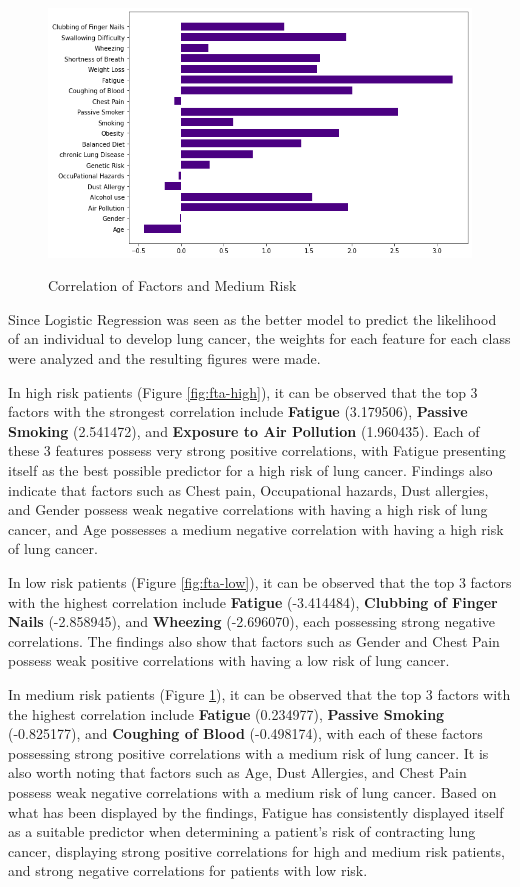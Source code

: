 \documentclass[runningheads]{llncs}
\begin{document}
\begin{figure}[h]           	 
\centering               	 
\caption{Correlation of Factors and Medium Risk}
\includegraphics[scale=0.5]{fta-medium.png}  	 
\label{fig:fta-medium}
\end{figure}

Since Logistic Regression was seen as the better model to predict the likelihood of an individual to develop lung cancer, the weights for each feature for each class were analyzed and the resulting figures were made.

In high risk patients (Figure \ref{fig:fta-high}), it can be observed that the top 3 factors with the strongest correlation include \textbf{Fatigue} (3.179506), \textbf{Passive Smoking} (2.541472), and \textbf{Exposure to Air Pollution} (1.960435). Each of these 3 features possess very strong positive correlations, with Fatigue presenting itself as the best possible predictor for a high risk of lung cancer. Findings also indicate that factors such as Chest pain, Occupational hazards, Dust allergies, and Gender possess weak negative correlations with having a high risk of lung cancer, and Age possesses a medium negative correlation with having a high risk of lung cancer.

In low risk patients (Figure \ref{fig:fta-low}), it can be observed that the top 3 factors with the highest correlation include \textbf{Fatigue} (-3.414484), \textbf{Clubbing of Finger Nails} (-2.858945), and \textbf{Wheezing} (-2.696070), each possessing strong negative correlations. The findings also show that factors such as Gender and Chest Pain possess weak positive correlations with having a low risk of lung cancer.

In medium risk patients (Figure \ref{fig:fta-medium}), it can be observed that the top 3 factors with the highest correlation include \textbf{Fatigue} (0.234977), \textbf{Passive Smoking} (-0.825177), and \textbf{Coughing of Blood} (-0.498174), with each of these factors possessing strong positive correlations with a medium risk of lung cancer. It is also worth noting that factors such as Age, Dust Allergies, and Chest Pain possess weak negative correlations with a medium risk of lung cancer.
Based on what has been displayed by the findings, Fatigue has consistently displayed itself as a suitable predictor when determining a patient's risk of contracting lung cancer, displaying strong positive correlations for high and medium risk patients, and strong negative correlations for patients with low risk.
\end{document}
